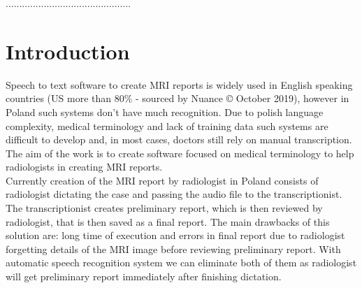 \documentclass[a4paper,11pt,twoside]{report}
\theoremstyle{definition}
\begin{document}
\begin{flushright}
  \begin{minipage}{50mm}
    \begin{center}
      ..............................................

    \end{center}
  \end{minipage}
\end{flushright}

\thispagestyle{empty}
\newpage

\null\thispagestyle{empty}\newpage


\tableofcontents
\thispagestyle{empty}




\null\thispagestyle{empty}\newpage
\pagestyle{fancy}
\setcounter{page}{11} %

\chapter*{Introduction}


Speech to text software to create MRI reports is widely used in English speaking countries (US more than 80\% - sourced by Nuance © October 2019), however in Poland such systems don’t have much recognition. Due to polish language complexity, medical terminology and lack of training data such systems are difficult to develop and, in most cases, doctors still rely on manual transcription. The aim of the work is to create software focused on medical terminology to help radiologists in creating MRI reports.\\

Currently creation of the MRI report by radiologist in Poland consists of radiologist dictating the case and passing the audio file to the transcriptionist. The transcriptionist creates preliminary report, which is then reviewed by radiologist, that is then saved as a final report. The main drawbacks of this solution are: long time of execution and errors in final report due to radiologist forgetting details of the MRI image before reviewing preliminary report. With automatic speech recognition system we can eliminate both of them as radiologist will get preliminary report immediately after finishing dictation. \\
\end{document}
